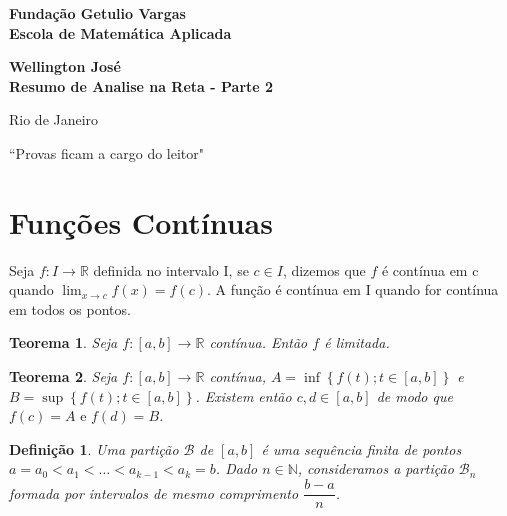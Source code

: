 \documentclass[12pt]{article}
\newtheorem{theorem}{Teorema}[section]
\newtheorem{definition}{Definição}
\begin{document}
\begin{titlepage}
\begin{center}
\textbf{\LARGE Fundação Getulio Vargas}\\ 
\textbf{\LARGE Escola de Matemática Aplicada}

\par
\vspace{170pt}
\textbf{\Large Wellington José}\\
\vspace{32pt}
\textbf{\Large Resumo de Analise na Reta - Parte 2}\\
\end{center}

\par
\vfill
\begin{center}
{{\normalsize Rio de Janeiro}\\
{\normalsize \the\year}}
\end{center}
\end{titlepage}

\thispagestyle{empty}

\begin{center}
    ``Provas ficam a cargo do leitor"
\end{center}

\section{Funções Contínuas}

Seja $f: I \rightarrow{} \mathbb{R}$ definida no intervalo I, se $c \in I$, dizemos que $f$ é contínua em c quando $\lim_{x \rightarrow{} c} f(x) = f(c)$. A função é contínua em I quando for contínua em todos os pontos.

\begin{theorem}
 Seja $f: [a, b] \rightarrow{} \mathbb{R}$ contínua. Então $f$ é limitada.
\end{theorem}

\begin{theorem}
  Seja $f: [a, b] \rightarrow{} \mathbb{R}$ contínua, $A = \inf \left\{ f(t); t \in [a, b] \right\}$ e $B = \sup \left\{ f(t) ; t \in [a, b] \right\}$. Existem então $c, d \in [a, b]$ de modo que $f(c) = A \text{ e } f(d) = B$.
\end{theorem}

\begin{definition}
    Uma partição $\mathcal{B}$ de $[a, b]$ é uma sequência finita de pontos $a = a_0 < a_1 < \dots < a_{k-1} < a_k = b$. Dado $n \in \mathbb{N}$, consideramos a partição $\mathcal{B}_n$ formada por intervalos de mesmo comprimento $\dfrac{b-a}{n}$.
\end{definition}
\end{document}
